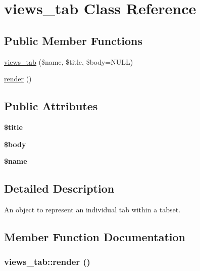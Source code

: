 \hypertarget{classviews__tab}{
\section{views\_\-tab Class Reference}
\label{classviews__tab}
}
\subsection*{Public Member Functions}
\begin{CompactItemize}
\item 
\hyperlink{classviews__tab_2fa4945f021094785ab172024ac6ed33}{views\_\-tab} (\$name, \$title, \$body=NULL)
\item 
\hyperlink{classviews__tab_5d33858a696c7f7ec72d6355d02a192f}{render} ()
\end{CompactItemize}
\subsection*{Public Attributes}
\begin{CompactItemize}
\item 
\hypertarget{classviews__tab_28782d354426a0227f914301c68baf2c}{
\textbf{\$title}}
\label{classviews__tab_28782d354426a0227f914301c68baf2c}

\item 
\hypertarget{classviews__tab_a1b367454c29a8bac008f40c0968514b}{
\textbf{\$body}}
\label{classviews__tab_a1b367454c29a8bac008f40c0968514b}

\item 
\hypertarget{classviews__tab_dfac950358773c027765b82c7294d168}{
\textbf{\$name}}
\label{classviews__tab_dfac950358773c027765b82c7294d168}

\end{CompactItemize}


\subsection{Detailed Description}
An object to represent an individual tab within a tabset. 

\subsection{Member Function Documentation}
\hypertarget{classviews__tab_5d33858a696c7f7ec72d6355d02a192f}{
\subsubsection[{render}]{\setlength{\rightskip}{0pt plus 5cm}views\_\-tab::render ()}}
\label{classviews__tab_5d33858a696c7f7ec72d6355d02a192f}


